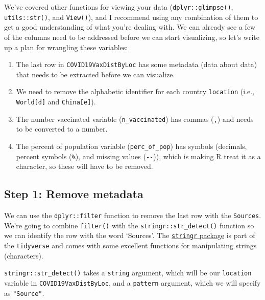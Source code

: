 \documentclass[11pt,]{article}
\newenvironment{Shaded}{\begin{snugshade}}{\end{snugshade}}
\newcommand{\AttributeTok}[1]{\textcolor[rgb]{0.77,0.63,0.00}{#1}}
\newcommand{\FunctionTok}[1]{\textcolor[rgb]{0.00,0.00,0.00}{#1}}
\newcommand{\NormalTok}[1]{#1}
\newcommand{\SpecialCharTok}[1]{\textcolor[rgb]{0.00,0.00,0.00}{#1}}
\newcommand{\StringTok}[1]{\textcolor[rgb]{0.31,0.60,0.02}{#1}}
\let\oldShaded\Shaded
\let\endoldShaded\endShaded
\renewenvironment{Shaded}{\footnotesize\oldShaded}{\endoldShaded}
\def\tightlist{}
\begin{document}
We've covered other functions for viewing your data
(\texttt{dplyr::glimpse()}, \texttt{utils::str()}, and \texttt{View()}),
and I recommend using any combination of them to get a good
understanding of what you're dealing with. We can already see a few of
the columns need to be addressed before we can start visualizing, so
let's write up a plan for wrangling these variables:

\begin{enumerate}
\def\labelenumi{\arabic{enumi}.}
\tightlist
\item
  The last row in \texttt{COVID19VaxDistByLoc} has some metadata (data
  about data) that needs to be extracted before we can visualize.
\item
  We need to remove the alphabetic identifier for each country
  \texttt{location} (i.e., \texttt{World{[}d{]}} and
  \texttt{China{[}e{]}}).\\
\item
  The number vaccinated variable (\texttt{n\_vaccinated}) has commas
  (\texttt{,}) and needs to be converted to a number.\\
\item
  The percent of population variable (\texttt{perc\_of\_pop}) has
  symbols (decimals, percent symbols (\texttt{\%}), and missing values
  (\texttt{-\/-})), which is making R treat it as a character, so these
  will have to be removed.
\end{enumerate}

\hypertarget{step-1-remove-metadata}{%
\subsection{Step 1: Remove metadata}\label{step-1-remove-metadata}}

We can use the \texttt{dplyr::filter} function to remove the last row
with the \texttt{Sources}. We're going to combine \texttt{filter()} with
the \texttt{stringr::str\_detect()} function so we can identify the row
with the word `Sources'. The
\href{https://stringr.tidyverse.org/index.html}{\texttt{stringr}
package} is part of the \texttt{tidyverse} and comes with some excellent
functions for manipulating strings (characters).

\texttt{stringr::str\_detect()} takes a \texttt{string} argument, which
will be our \texttt{location} variable in \texttt{COVID19VaxDistByLoc},
and a \texttt{pattern} argument, which we will specify as
\texttt{"Source"}.

\begin{Shaded}
\end{Shaded}
\end{document}
